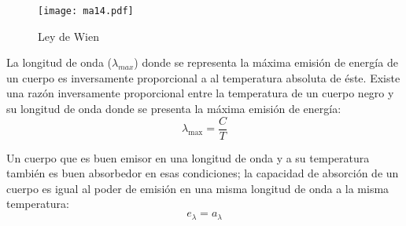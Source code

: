 \begin{figure}[h!]
\centering
  \texttt{[image: ma14.pdf]}
  \caption{Ley de Wien}   
  \label{ma14}
\end{figure}
\begin{definition}[Wien]
    La longitud de onda ($\lambda_{max}$) donde se representa la máxima emisión de energía de un cuerpo es inversamente proporcional a al temperatura absoluta de éste. Existe una razón inversamente proporcional entre la temperatura de un cuerpo negro y su longitud de onda donde se presenta la máxima emisión de energía:
    \begin{equation}
        \lambda_{\max }= \frac{C}{T}
    \end{equation}
\end{definition}
\begin{definition}[Kirchhoff]
    Un cuerpo que es buen emisor en una longitud de onda y a su temperatura también es buen absorbedor en esas condiciones; la capacidad de absorción de un cuerpo es igual al poder de emisión en una misma longitud de onda a la misma temperatura:
    \begin{equation}
        e_{\lambda} = a_{\lambda}
    \end{equation}
\end{definition}


